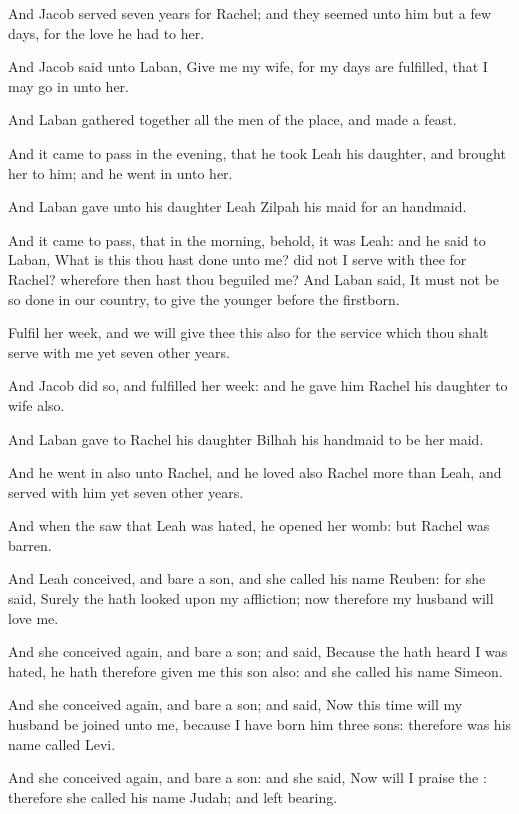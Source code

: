 \verse And Jacob served seven years for Rachel; and they seemed unto him but a few days, for the love he had to her.

\verse And Jacob said unto Laban, Give me my wife, for my days are fulfilled, that I may go in unto her.

\verse And Laban gathered together all the men of the place, and made a feast.

\verse And it came to pass in the evening, that he took Leah his daughter, and brought her to him; and he went in unto her.

\verse And Laban gave unto his daughter Leah Zilpah his maid for an handmaid.

\verse And it came to pass, that in the morning, behold, it was Leah: and he said to Laban, What is this thou hast done unto me? did not I serve with thee for Rachel? wherefore then hast thou beguiled me?  \verse And Laban said, It must not be so done in our country, to give the younger before the firstborn.

\verse Fulfil her week, and we will give thee this also for the service which thou shalt serve with me yet seven other years.

\verse And Jacob did so, and fulfilled her week: and he gave him Rachel his daughter to wife also.

\verse And Laban gave to Rachel his daughter Bilhah his handmaid to be her maid.

\verse And he went in also unto Rachel, and he loved also Rachel more than Leah, and served with him yet seven other years.

\verse And when the \LORD saw that Leah was hated, he opened her womb: but Rachel was barren.

\verse And Leah conceived, and bare a son, and she called his name Reuben: for she said, Surely the \LORD hath looked upon my affliction; now therefore my husband will love me.

\verse And she conceived again, and bare a son; and said, Because the \LORD hath heard I was hated, he hath therefore given me this son also: and she called his name Simeon.

\verse And she conceived again, and bare a son; and said, Now this time will my husband be joined unto me, because I have born him three sons: therefore was his name called Levi.

\verse And she conceived again, and bare a son: and she said, Now will I praise the \LORD: therefore she called his name Judah; and left bearing.

